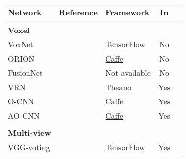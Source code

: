 \begin{table}[]
	\centering
	\begin{tabular}{lllcc}
		\hline
		\textbf{Network}       & \textbf{Reference}                       & \textbf{Framework}                                                                     & \textbf{In} &  \\ \hline
		                       &                                          &                                                                                        &             &  \\
		\textbf{Voxel }        &                                          &                                                                                        &             &  \\
		VoxNet                 & \cite{maturana_voxnet:_2015}             & \href{https://github.com/Durant35/VoxNet}{TensorFlow}                                  &     No      &  \\
		ORION                  & \cite{sedaghat_orientation-boosted_2016} & \href{https://github.com/lmb-freiburg/orion}{Caffe}                                    &     No      &  \\
		FusionNet              & \cite{hegde_fusionnet:_2016}             & Not available                                                                          &     No      &  \\
		VRN                    & \cite{brock_generative_2016}             & \href{https://github.com/ajbrock/Generative-and-Discriminative-Voxel-Modeling}{Theano} &     Yes     &  \\
		O-CNN                  & \cite{wang_o-cnn:_2017}                  & \href{https://github.com/Microsoft/O-CNN}{Caffe}                                       &     Yes     &  \\
		AO-CNN                 & \cite{wang_adaptive_2018}                & \href{https://github.com/Microsoft/O-CNN}{Caffe}                                       &     Yes     &  \\
		                       &                                          &                                                                                        &             &  \\
		\textbf{Multi-view }   &                                          &                                                                                        &             &  \\
		VGG-voting             & \cite{simonyan_very_2014}                & \href{https://github.com/machrisaa/tensorflow-vgg}{TensorFlow}                         &     Yes     &  \\

\end{tabular}
\end{table}

